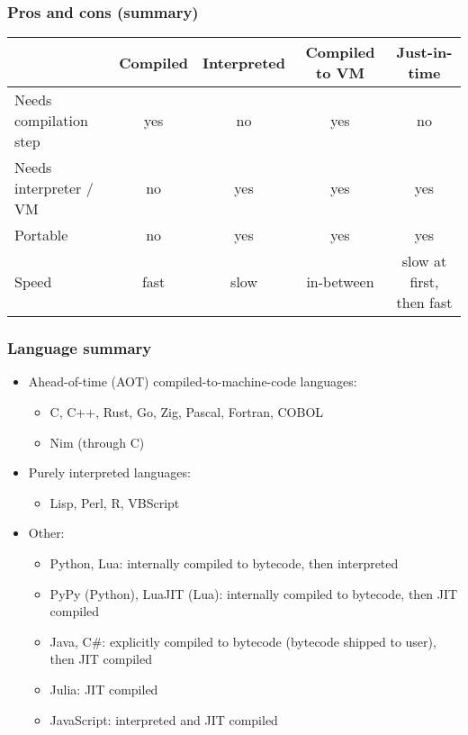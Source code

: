 \documentclass[12pt]{article}
\begin{document}






\subsubsection{Pros and cons (summary)}

\begin{tabular}{lcccc}
\toprule
 & Compiled & Interpreted & Compiled to VM & Just-in-time \\
\midrule
Needs compilation step & yes & no & yes & no \\
Needs interpreter / VM & no & yes & yes & yes \\
Portable & no & yes & yes & yes \\
Speed & fast & slow & in-between & slow at first, then fast \\
\bottomrule
\end{tabular}

\subsubsection{Language summary}

\begin{itemize}
    \item Ahead-of-time (AOT) compiled-to-machine-code languages:
    \begin{itemize}
        \item C, C++, Rust, Go, Zig, Pascal, Fortran, COBOL
        \item Nim (through C)
    \end{itemize}
    \item Purely interpreted languages:
    \begin{itemize}
        \item Lisp, Perl, R, VBScript
    \end{itemize}
    \item Other:
    \begin{itemize}
        \item Python, Lua: internally compiled to bytecode, then interpreted
        \item PyPy (Python), LuaJIT (Lua): internally compiled to bytecode, then JIT compiled
        \item Java, C\#: explicitly compiled to bytecode (bytecode shipped to user), then JIT compiled
        \item Julia: JIT compiled
        \item JavaScript: interpreted and JIT compiled
    \end{itemize}
\end{itemize}
\end{document}
